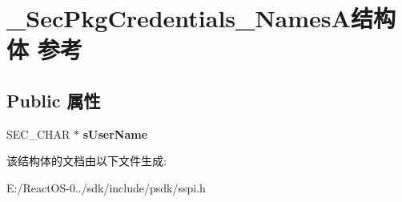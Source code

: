 \hypertarget{struct___sec_pkg_credentials___names_a}{}\section{\+\_\+\+Sec\+Pkg\+Credentials\+\_\+\+Names\+A结构体 参考}
\label{struct___sec_pkg_credentials___names_a}
\subsection*{Public 属性}
\begin{DoxyCompactItemize}
\item 
\mbox{\label{struct___sec_pkg_credentials___names_a_a26200da74b044bf37ac52d3ff64f3a91}} 
S\+E\+C\+\_\+\+C\+H\+AR $\ast$ {\bfseries s\+User\+Name}
\end{DoxyCompactItemize}


该结构体的文档由以下文件生成\+:\begin{DoxyCompactItemize}
\item 
E\+:/\+React\+O\+S-\/0../sdk/include/psdk/sspi.\+h\end{DoxyCompactItemize}
